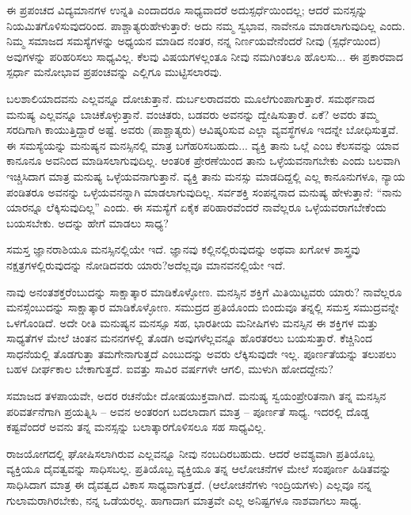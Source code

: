 \newpage

ಈ ಪ್ರಪಂಚದ ವಿದ್ಯಮಾನಗಳ ಉನ್ನತಿ ಎಂದಾದರೂ ಸಾಧ್ಯವಾದರೆ ಅದು\break ಸ್ಪರ್ಧೆಯಿಂದಲ್ಲ; ಆದರೆ ಮನಸ್ಸನ್ನು ನಿಯಮಿತಗೊಳಿಸುವುದರಿಂದ. ಪಾಶ್ಚಾತ್ಯರು\break ಹೇಳುತ್ತಾರೆ: ಅದು ನಮ್ಮ ಸ್ವಭಾವ, ನಾವೇನೂ ಮಾಡಲಾಗುವುದಿಲ್ಲ ಎಂದು. ನಿಮ್ಮ ಸಮಾಜದ ಸಮಸ್ಯೆಗಳನ್ನು ಅಧ್ಯಯನ ಮಾಡಿದ ನಂತರ, ನನ್ನ ನಿರ್ಣಯವೇನೆಂದರೆ ನೀವು (ಸ್ಪರ್ಧೆಯಿಂದ) ಅವುಗಳನ್ನು ಪರಿಹರಿಸಲು ಸಾಧ್ಯವಿಲ್ಲ. ಕೆಲವು ವಿಷಯಗಳಲ್ಲಂತೂ ನೀವು ನಮಗಿಂತಲೂ ಹೊಲಸು... ಈ ಪ್ರಕಾರವಾದ ಸ್ಪರ್ಧಾ ಮನೋಭಾವ ಪ್ರಪಂಚವನ್ನು ಎಲ್ಲಿಗೂ ಮುಟ್ಟಿಸಲಾರವು.

\vskip 6pt

ಬಲಶಾಲಿಯಾದವನು ಎಲ್ಲವನ್ನೂ ದೋಚುತ್ತಾನೆ. ದುರ್ಬಲರಾದವರು ಮೂಲೆಗುಂಪಾಗುತ್ತಾರೆ. ಸಮರ್ಥನಾದ ಮನುಷ್ಯ ಎಲ್ಲವನ್ನೂ ಬಾಚಿಕೊಳ್ಳುತ್ತಾನೆ. ವಂಚಿತರು, ಬಡವರು ಅವನನ್ನು ದ್ವೇಷಿಸುತ್ತಾರೆ. ಏಕೆ? ಅವರು ತಮ್ಮ ಸರದಿಗಾಗಿ ಕಾಯುತ್ತಿದ್ದಾರೆ ಅಷ್ಟೆ. ಅವರು (ಪಾಶ್ಚಾತ್ಯರು) ಆವಿಷ್ಕರಿಸುವ ಎಲ್ಲಾ ವ್ಯವಸ್ಥೆಗಳೂ ಇದನ್ನೇ ಬೋಧಿಸುತ್ತವೆ. ಈ ಸಮಸ್ಯೆಯನ್ನು ಮನುಷ್ಯನ ಮನಸ್ಸಿನಲ್ಲಿ ಮಾತ್ರ ಬಗೆಹರಿಸಬಹುದು... ವ್ಯಕ್ತಿ ತಾನು ಒಲ್ಲೆ ಎಂಬ ಕೆಲಸವನ್ನು ಯಾವ ಕಾನೂನೂ ಅವನಿಂದ ಮಾಡಿಸಲಾಗುವುದಿಲ್ಲ. ಆಂತರಿಕ ಪ್ರೇರಣೆಯಿಂದ ತಾನು ಒಳ್ಳೆಯವನಾಗಬೇಕು ಎಂದು ಬಲವಾಗಿ ಇಚ್ಚಿಸಿದಾಗ ಮಾತ್ರ ಮನುಷ್ಯ ಒಳ್ಳೆಯವನಾಗುತ್ತಾನೆ. ವ್ಯಕ್ತಿ ತಾನು ಮನಸ್ಸು ಮಾಡದಿದ್ದಲ್ಲಿ ಎಲ್ಲ ಕಾನೂನುಗಳೂ, ನ್ಯಾಯ ಪಂಡಿತರೂ ಅವನನ್ನು ಒಳ್ಳೆಯವನನ್ನಾಗಿ ಮಾಡಲಾಗುವುದಿಲ್ಲ. ಸರ್ವಶಕ್ತಿ ಸಂಪನ್ನನಾದ ಮನುಷ್ಯ ಹೇಳುತ್ತಾನೆ: “ನಾನು ಯಾರನ್ನೂ ಲೆಕ್ಕಿಸುವುದಿಲ್ಲ” ಎಂದು. ಈ ಸಮಸ್ಯೆಗೆ ಏಕೈಕ ಪರಿಹಾರವೆಂದರೆ ನಾವೆಲ್ಲರೂ ಒಳ್ಳೆಯವರಾಗಬೇಕೆಂದು ಬಯಸಬೇಕು. ಅದನ್ನು ಹೇಗೆ ಮಾಡಲು ಸಾಧ್ಯ?

\vskip 6pt

ಸಮಸ್ತ ಜ್ಞಾನರಾಶಿಯೂ ಮನಸ್ಸಿನಲ್ಲಿಯೇ ಇದೆ. ಜ್ಞಾನವು ಕಲ್ಲಿನಲ್ಲಿರುವುದನ್ನು ಅಥವಾ ಖಗೋಳ ಶಾಸ್ತ್ರವು ನಕ್ಷತ್ರಗಳಲ್ಲಿರುವುದನ್ನು ನೋಡಿದವರು ಯಾರು?\break ಅದೆಲ್ಲವೂ ಮಾನವನಲ್ಲಿಯೇ ಇದೆ.

\vskip 6pt

ನಾವು ಅನಂತಶಕ್ತರೆಂಬುದನ್ನು ಸಾಕ್ಷಾತ್ಕಾರ ಮಾಡಿಕೊಳ್ಳೋಣ. ಮನಸ್ಸಿನ ಶಕ್ತಿಗೆ ಮಿತಿಯಿಟ್ಟವರು ಯಾರು? ನಾವೆಲ್ಲರೂ ಮನಸ್ಸೆಂಬುದನ್ನು ಸಾಕ್ಷಾತ್ಕಾರ ಮಾಡಿಕೊಳ್ಳೋಣ. ಸಮುದ್ರದ ಪ್ರತಿಯೊಂದು ಬಿಂದುವೂ ತನ್ನಲ್ಲಿ ಸಮಸ್ತ ಸಮುದ್ರವನ್ನೇ ಒಳಗೊಂಡಿದೆ. ಅದೇ ರೀತಿ ಮನುಷ್ಯನ ಮನಸ್ಸೂ ಸಹ, ಭಾರತೀಯ ಮನೀಷಿಗಳು ಮನಸ್ಸಿನ ಈ ಶಕ್ತಿಗಳ ಮತ್ತು ಸಾಧ್ಯತೆಗಳ ಮೇಲೆ ಚಿಂತನ ಮನನಗಳಲ್ಲಿ ತೊಡಗಿ ಅವುಗಳೆಲ್ಲವನ್ನೂ ಹೊರತರಲು ಬಯಸುತ್ತಾರೆ. ಕೆಚ್ಚಿನಿಂದ ಸಾಧನೆಯಲ್ಲಿ ತೊಡಗುತ್ತಾ ತಮಗೇನಾಗುತ್ತದೆ ಎಂಬುದನ್ನು ಅವರು ಲೆಕ್ಕಿಸುವುದೇ ಇಲ್ಲ. ಪೂರ್ಣತೆಯನ್ನು ತಲುಪಲು ಬಹಳ ದೀರ್ಘಕಾಲ ಬೇಕಾಗುತ್ತದೆ. ಐವತ್ತು ಸಾವಿರ ವರ್ಷಗಳೇ ಆಗಲಿ, ಮುಳುಗಿ ಹೋದದ್ದೇನು?

\vskip 6pt

ಸಮಾಜದ ತಳಪಾಯವೇ, ಅದರ ರಚನೆಯೇ ದೋಷಯುಕ್ತವಾಗಿದೆ. ಮನುಷ್ಯ ಸ್ವಯಂಪ್ರೇರಿತನಾಗಿ ತನ್ನ ಮನಸ್ಸಿನ ಪರಿವರ್ತನೆಗಾಗಿ ಪ್ರಯತ್ನಿಸಿ – ಅವನ ಅಂತರಂಗ ಬದಲಾದಾಗ ಮಾತ್ರ – ಪೂರ್ಣತೆ ಸಾಧ್ಯ. ಇದರಲ್ಲಿ ದೊಡ್ಡ ಕಷ್ಟವೆಂದರೆ ಅವನು ತನ್ನ ಮನಸ್ಸನ್ನು ಬಲಾತ್ಕಾರಗೊಳಿಸಲೂ ಸಹ ಸಾಧ್ಯವಿಲ್ಲ.

\vskip 6pt

ರಾಜಯೋಗದಲ್ಲಿ ಘೋಷಿಸಲಾಗಿರುವ ಎಲ್ಲವನ್ನೂ ನೀವು ನಂಬದಿರಬಹುದು. ಆದರೆ ಅವಶ್ಯವಾಗಿ ಪ್ರತಿಯೊಬ್ಬ ವ್ಯಕ್ತಿಯೂ ದೈವತ್ವವನ್ನು ಸಾಧಿಸಬಲ್ಲ. ಪ್ರತಿಯೊಬ್ಬ ವ್ಯಕ್ತಿಯೂ ತನ್ನ ಆಲೋಚನೆಗಳ ಮೇಲೆ ಸಂಪೂರ್ಣ ಹಿಡಿತವನ್ನು ಸಾಧಿಸಿದಾಗ ಮಾತ್ರ ಈ ದೈವತ್ವದ ವಿಕಾಸ ಸಾಧ್ಯವಾಗುತ್ತದೆ. (ಆಲೋಚನೆಗಳು ಇಂದ್ರಿಯಗಳು) ಎಲ್ಲವೂ ನನ್ನ ಗುಲಾಮರಾಗಿರಬೇಕು, ನನ್ನ ಒಡೆಯರಲ್ಲ. ಹಾಗಾದಾಗ ಮಾತ್ರವೇ ಎಲ್ಲ ಅನಿಷ್ಟಗಳೂ ನಾಶವಾಗಲು ಸಾಧ್ಯ.

